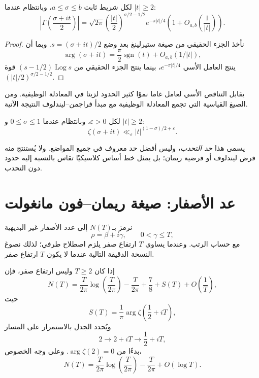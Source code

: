\begin{corollary}
\label{cor:gamma-factor-vertical-size}
\provedhere
لكل شريط ثابت \(a\leq\sigma\leq b\)، وبانتظام عندما \(|t|\geq2\):
\[
\left|
\Gamma\!\left(\frac{\sigma+it}{2}\right)
\right|
=
\sqrt{2\pi}
\left(\frac{|t|}{2}\right)^{\sigma/2-1/2}
e^{-\pi|t|/4}
\left(1+O_{a,b}\!\left(\frac1{|t|}\right)\right).
\]
\end{corollary}

\begin{proof}
نأخذ الجزء الحقيقي من صيغة ستيرلينغ بعد وضع
\(s=(\sigma+it)/2\). وبما أن
\[
\arg(\sigma+it)
=
\frac{\pi}{2}\operatorname{sgn}(t)
+O_{a,b}(1/|t|),
\]
ينتج العامل الأسي \(e^{-\pi|t|/4}\)، بينما ينتج الجزء الحقيقي من
\((s-1/2)\operatorname{Log} s\) قوة \((|t|/2)^{\sigma/2-1/2}\).
\end{proof}

يقابل التناقص الأسي لعامل غاما نموًا كثير الحدود لزيتا في المعادلة
الوظيفية. ومن الصيغ القياسية التي تجمع المعادلة الوظيفية مع مبدأ
فراجمن--ليندلوف النتيجة الآتية.

\begin{theorem}
\label{thm:zeta-convexity-bound}
لكل \(\varepsilon>0\)، وبانتظام عندما \(0\leq\sigma\leq1\) و
\(|t|\geq2\):
\[
\zeta(\sigma+it)
\ll_{\varepsilon}
|t|^{(1-\sigma)/2+\varepsilon}.
\]
\end{theorem}

يسمى هذا \emph{حد التحدب}، وليس أفضل حد معروف في جميع المواضع. ولا
يُستنتج منه فرض ليندلوف أو فرضية ريمان؛ بل يمثل خط أساس كلاسيكيًا تقاس
بالنسبة إليه حدود دون التحدب.

\section{عد الأصفار: صيغة ريمان--فون مانغولت}

نرمز بـ\(N(T)\) إلى عدد الأصفار غير البديهية
\[
\rho=\beta+i\gamma,
\qquad 0<\gamma\leq T,
\]
مع حساب الرتب. وعندما يساوي \(T\) ارتفاع صفر يلزم اصطلاح طرفي؛ لذلك
نصوغ النسخة الدقيقة التالية عندما لا يكون \(T\) ارتفاع صفر.

\begin{theorem}
\label{thm:riemann-von-mangoldt}
إذا كان \(T\geq2\) وليس ارتفاع صفر، فإن
\[
N(T)
=
\frac{T}{2\pi}\log\!\left(\frac{T}{2\pi}\right)
-\frac{T}{2\pi}
+\frac78
+S(T)
+O\!\left(\frac1T\right),
\]
حيث
\[
S(T)
=
\frac1\pi
\arg\zeta\!\left(\frac12+iT\right),
\]
ويُحدد الجدل بالاستمرار على المسار
\[
2\longrightarrow 2+iT\longrightarrow \frac12+iT,
\]
بدءًا من \(\arg\zeta(2)=0\). وعلى وجه الخصوص،
\[
N(T)
=
\frac{T}{2\pi}\log\!\left(\frac{T}{2\pi}\right)
-\frac{T}{2\pi}
+O(\log T).
\]
\end{theorem}

